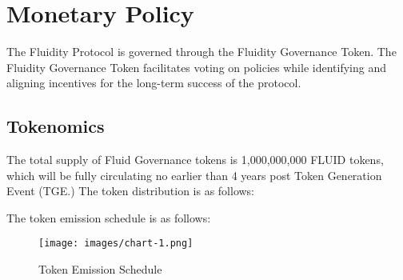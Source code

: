 
\section{Monetary Policy}
The Fluidity Protocol is governed through the Fluidity Governance Token. The Fluidity Governance Token facilitates voting on policies while identifying and aligning incentives for the long-term success of the protocol.

\subsection{Tokenomics}
The total supply of Fluid Governance tokens is 1,000,000,000 FLUID tokens, which will be fully circulating no earlier than 4 years post Token Generation Event (TGE.) The token distribution is as follows:

\vspace{1em}
 \begingroup
            \par
\endgroup
           \vspace{1em}

The token emission schedule is as follows:

\begin{figure}[h]
    \centering
    \texttt{[image: images/chart-1.png]}
    \caption{Token Emission Schedule}
\end{figure}


